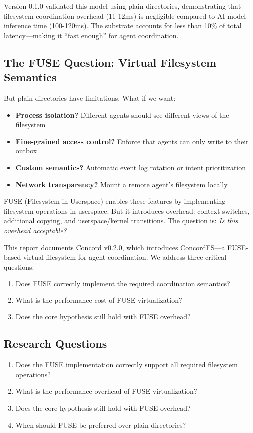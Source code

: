 \documentclass[11pt]{article}
\begin{document}
Version 0.1.0 validated this model using plain directories, demonstrating that filesystem coordination overhead (11-12ms) is negligible compared to AI model inference time (100-120ms). The substrate accounts for less than 10\% of total latency---making it ``fast enough'' for agent coordination.

\subsection{The FUSE Question: Virtual Filesystem Semantics}

But plain directories have limitations. What if we want:
\begin{itemize}
\item \textbf{Process isolation?} Different agents should see different views of the filesystem
\item \textbf{Fine-grained access control?} Enforce that agents can only write to their outbox
\item \textbf{Custom semantics?} Automatic event log rotation or intent prioritization
\item \textbf{Network transparency?} Mount a remote agent's filesystem locally
\end{itemize}

FUSE (Filesystem in Userspace) enables these features by implementing filesystem operations in userspace. But it introduces overhead: context switches, additional copying, and userspace/kernel transitions. The question is: \textit{Is this overhead acceptable?}

This report documents Concord v0.2.0, which introduces ConcordFS---a FUSE-based virtual filesystem for agent coordination. We address three critical questions:

\begin{enumerate}
\item Does FUSE correctly implement the required coordination semantics?
\item What is the performance cost of FUSE virtualization?
\item Does the core hypothesis still hold with FUSE overhead?
\end{enumerate}

\subsection{Research Questions}

\begin{enumerate}
\item Does the FUSE implementation correctly support all required filesystem operations?
\item What is the performance overhead of FUSE virtualization?
\item Does the core hypothesis still hold with FUSE overhead?
\item When should FUSE be preferred over plain directories?
\end{enumerate}
\end{document}
